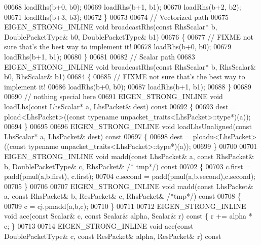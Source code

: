 \begin{DoxyCode}
00668     loadRhs(b+0, b0);
00669     loadRhs(b+1, b1);
00670     loadRhs(b+2, b2);
00671     loadRhs(b+3, b3);
00672   \}
00673   
00674   \textcolor{comment}{// Vectorized path}
00675   EIGEN\_STRONG\_INLINE \textcolor{keywordtype}{void} broadcastRhs(\textcolor{keyword}{const} RhsScalar* b, DoublePacketType& b0, DoublePacketType& b1)
00676   \{
00677     \textcolor{comment}{// FIXME not sure that's the best way to implement it!}
00678     loadRhs(b+0, b0);
00679     loadRhs(b+1, b1);
00680   \}
00681   
00682   \textcolor{comment}{// Scalar path}
00683   EIGEN\_STRONG\_INLINE \textcolor{keywordtype}{void} broadcastRhs(\textcolor{keyword}{const} RhsScalar* b, RhsScalar& b0, RhsScalar& b1)
00684   \{
00685     \textcolor{comment}{// FIXME not sure that's the best way to implement it!}
00686     loadRhs(b+0, b0);
00687     loadRhs(b+1, b1);
00688   \}
00689 
00690   \textcolor{comment}{// nothing special here}
00691   EIGEN\_STRONG\_INLINE \textcolor{keywordtype}{void} loadLhs(\textcolor{keyword}{const} LhsScalar* a, LhsPacket& dest)\textcolor{keyword}{ const}
00692 \textcolor{keyword}{  }\{
00693     dest = pload<LhsPacket>((\textcolor{keyword}{const} \textcolor{keyword}{typename} unpacket\_traits<LhsPacket>::type*)(a));
00694   \}
00695 
00696   EIGEN\_STRONG\_INLINE \textcolor{keywordtype}{void} loadLhsUnaligned(\textcolor{keyword}{const} LhsScalar* a, LhsPacket& dest)\textcolor{keyword}{ const}
00697 \textcolor{keyword}{  }\{
00698     dest = ploadu<LhsPacket>((\textcolor{keyword}{const} \textcolor{keyword}{typename} unpacket\_traits<LhsPacket>::type*)(a));
00699   \}
00700 
00701   EIGEN\_STRONG\_INLINE \textcolor{keywordtype}{void} madd(\textcolor{keyword}{const} LhsPacket& a, \textcolor{keyword}{const} RhsPacket& b, DoublePacketType& c, RhsPacket& \textcolor{comment}{/*
      tmp*/})\textcolor{keyword}{ const}
00702 \textcolor{keyword}{  }\{
00703     c.first   = padd(pmul(a,b.first), c.first);
00704     c.second  = padd(pmul(a,b.second),c.second);
00705   \}
00706 
00707   EIGEN\_STRONG\_INLINE \textcolor{keywordtype}{void} madd(\textcolor{keyword}{const} LhsPacket& a, \textcolor{keyword}{const} RhsPacket& b, ResPacket& c, RhsPacket& \textcolor{comment}{/*tmp*/})\textcolor{keyword}{
       const}
00708 \textcolor{keyword}{  }\{
00709     c = cj.pmadd(a,b,c);
00710   \}
00711   
00712   EIGEN\_STRONG\_INLINE \textcolor{keywordtype}{void} acc(\textcolor{keyword}{const} Scalar& c, \textcolor{keyword}{const} Scalar& alpha, Scalar& r)\textcolor{keyword}{ const }\{ r += alpha * c; \}
00713   
00714   EIGEN\_STRONG\_INLINE \textcolor{keywordtype}{void} acc(\textcolor{keyword}{const} DoublePacketType& c, \textcolor{keyword}{const} ResPacket& alpha, ResPacket& r)\textcolor{keyword}{ const}

\end{DoxyCode}
